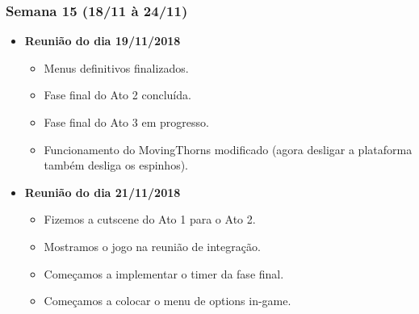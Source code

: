 \documentclass[a4paper, 11pt]{article}
\begin{document}
\subsubsection{Semana 15 (18/11 à 24/11)}
	\begin{itemize} 
		\item \textbf{Reunião do dia 19/11/2018}

		\begin{itemize}

   			\item  Menus definitivos finalizados.
    		\item Fase final do Ato 2 concluída.
    		\item Fase final do Ato 3 em progresso.
    		\item Funcionamento do MovingThorns modificado (agora desligar a plataforma também desliga os espinhos).

   		\end{itemize}

		\item \textbf{Reunião do dia 21/11/2018}

		\begin{itemize}

    		\item Fizemos a cutscene do Ato 1 para o Ato 2.
    		\item Mostramos o jogo na reunião de integração.
    		\item Começamos a implementar o timer da fase final.
    		\item Começamos a colocar o menu de options in-game.

		\end{itemize}

	\end{itemize}
\end{document}
